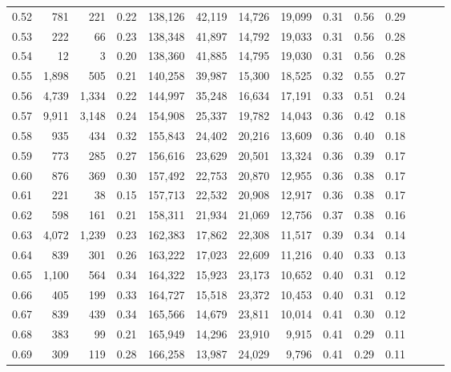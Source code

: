 \begin{tabular}{rrrrrrrrrrrrrr}
0.52 &     781 &    221 &  0.22 &  138,126 &   42,119 &  14,726 &  19,099 &  0.31 &  0.56 &      0.29 \\
0.53 &     222 &     66 &  0.23 &  138,348 &   41,897 &  14,792 &  19,033 &  0.31 &  0.56 &      0.28 \\
0.54 &      12 &      3 &  0.20 &  138,360 &   41,885 &  14,795 &  19,030 &  0.31 &  0.56 &      0.28 \\
0.55 &   1,898 &    505 &  0.21 &  140,258 &   39,987 &  15,300 &  18,525 &  0.32 &  0.55 &      0.27 \\
0.56 &   4,739 &  1,334 &  0.22 &  144,997 &   35,248 &  16,634 &  17,191 &  0.33 &  0.51 &      0.24 \\
0.57 &   9,911 &  3,148 &  0.24 &  154,908 &   25,337 &  19,782 &  14,043 &  0.36 &  0.42 &      0.18 \\
0.58 &     935 &    434 &  0.32 &  155,843 &   24,402 &  20,216 &  13,609 &  0.36 &  0.40 &      0.18 \\
0.59 &     773 &    285 &  0.27 &  156,616 &   23,629 &  20,501 &  13,324 &  0.36 &  0.39 &      0.17 \\
0.60 &     876 &    369 &  0.30 &  157,492 &   22,753 &  20,870 &  12,955 &  0.36 &  0.38 &      0.17 \\
0.61 &     221 &     38 &  0.15 &  157,713 &   22,532 &  20,908 &  12,917 &  0.36 &  0.38 &      0.17 \\
0.62 &     598 &    161 &  0.21 &  158,311 &   21,934 &  21,069 &  12,756 &  0.37 &  0.38 &      0.16 \\
0.63 &   4,072 &  1,239 &  0.23 &  162,383 &   17,862 &  22,308 &  11,517 &  0.39 &  0.34 &      0.14 \\
0.64 &     839 &    301 &  0.26 &  163,222 &   17,023 &  22,609 &  11,216 &  0.40 &  0.33 &      0.13 \\
0.65 &   1,100 &    564 &  0.34 &  164,322 &   15,923 &  23,173 &  10,652 &  0.40 &  0.31 &      0.12 \\
0.66 &     405 &    199 &  0.33 &  164,727 &   15,518 &  23,372 &  10,453 &  0.40 &  0.31 &      0.12 \\
0.67 &     839 &    439 &  0.34 &  165,566 &   14,679 &  23,811 &  10,014 &  0.41 &  0.30 &      0.12 \\
0.68 &     383 &     99 &  0.21 &  165,949 &   14,296 &  23,910 &   9,915 &  0.41 &  0.29 &      0.11 \\
0.69 &     309 &    119 &  0.28 &  166,258 &   13,987 &  24,029 &   9,796 &  0.41 &  0.29 &      0.11 \\

\end{tabular}
